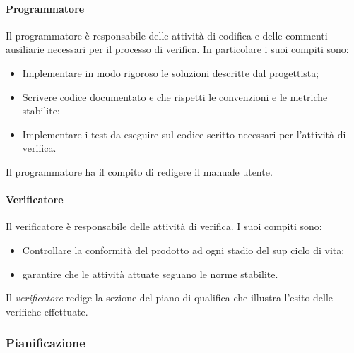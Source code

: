 \paragraph{Programmatore}
Il programmatore è responsabile delle attività di codifica e delle commenti ausiliarie necessari per il processo di verifica.
In particolare i suoi compiti sono:
\begin{itemize}
	\item Implementare in modo rigoroso le soluzioni descritte dal progettista;
	\item Scrivere codice documentato e che rispetti le convenzioni e le metriche stabilite;
	\item Implementare i test da eseguire sul codice scritto necessari per l'attività di verifica.
\end{itemize}
Il programmatore  ha il compito di redigere il manuale utente. 
\paragraph{Verificatore}
Il verificatore è responsabile delle attività di verifica.
I suoi compiti sono:
\begin{itemize}
	\item Controllare la conformità del prodotto ad ogni stadio del sup ciclo di vita;
	\item garantire che le attività attuate seguano le norme stabilite.
\end{itemize}
Il \emph{verificatore} redige la sezione del piano di qualifica che illustra l'esito delle verifiche effettuate.


\subsubsection{Pianificazione}
